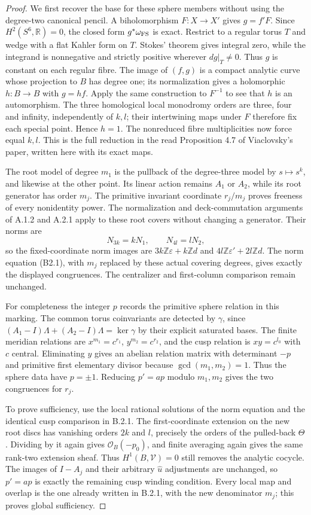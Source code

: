 \begin{proof}
We first recover the base for these sphere members without using the degree-two canonical pencil. A biholomorphism $F:X\to X'$ gives $g=f'F$. Since $H^2(S^6,\mathbb R)=0$, the closed form $g^*\omega_{\rm FS}$ is exact. Restrict to a regular torus $T$ and wedge with a flat Kahler form on $T$. Stokes' theorem gives integral zero, while the integrand is nonnegative and strictly positive wherever $dg|_T\ne0$. Thus $g$ is constant on each regular fibre. The image of $(f,g)$ is a compact analytic curve whose projection to $B$ has degree one; its normalization gives a holomorphic $h:B\to B$ with $g=hf$. Apply the same construction to $F^{-1}$ to see that $h$ is an automorphism. The three homological local monodromy orders are three, four and infinity, independently of $k,l$; their intertwining maps under $F$ therefore fix each special point. Hence $h=1$. The nonreduced fibre multiplicities now force equal $k,l$. This is the full reduction in the read Proposition 4.7 of Viaclovsky's paper, written here with its exact maps.

The root model of degree $m_1$ is the pullback of the degree-three model by $s\mapsto s^k$, and likewise at the other point. Its linear action remains $A_1$ or $A_2$, while its root generator has order $m_j$. The primitive invariant coordinate $r_j/m_j$ proves freeness of every nonidentity power. The normalization and deck-commutation arguments of A.1.2 and A.2.1 apply to these root covers without changing a generator. Their norms are
\[
 N_{3k}=kN_1,\qquad N_{4l}=lN_2,
\]
so the fixed-coordinate norm images are $3k\mathbb Z\varepsilon+k\mathbb Zd$ and $4l\mathbb Z\varepsilon'+2l\mathbb Zd$. The norm equation (B2.1), with $m_j$ replaced by these actual covering degrees, gives exactly the displayed congruences. The centralizer and first-column comparison remain unchanged.

For completeness the integer $p$ records the primitive sphere relation in this marking. The common torus coinvariants are detected by $\gamma$, since $(A_1-I)\Lambda+(A_2-I)\Lambda=\ker\gamma$ by their explicit saturated bases. The finite meridian relations are $x^{m_1}=c^{r_1}$, $y^{m_2}=c^{r_2}$, and the cusp relation is $xy=c^{l_0}$ with $c$ central. Eliminating $y$ gives an abelian relation matrix with determinant $-p$ and primitive first elementary divisor because $\gcd(m_1,m_2)=1$. Thus the sphere data have $p=\pm1$. Reducing $p'=ap$ modulo $m_1,m_2$ gives the two congruences for $r_j$.

To prove sufficiency, use the local rational solutions of the norm equation and the identical cusp comparison in B.2.1. The first-coordinate extension on the new root discs has vanishing orders $2k$ and $l$, precisely the orders of the pulled-back $\Theta$. Dividing by it again gives $\mathcal O_B(-p_0)$, and finite averaging again gives the same rank-two extension sheaf. Thus $H^1(B,\mathcal V)=0$ still removes the analytic cocycle. The images of $I-A_j$ and their arbitrary $\widehat u$ adjustments are unchanged, so $p'=ap$ is exactly the remaining cusp winding condition. Every local map and overlap is the one already written in B.2.1, with the new denominator $m_j$; this proves global sufficiency.


\end{proof}
